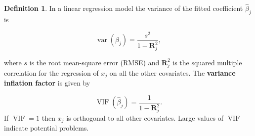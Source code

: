 \documentclass[
  openany]{book}
\theoremstyle{definition}
\newtheorem{definition}{Definition}[chapter]
\theoremstyle{definition}
\theoremstyle{definition}
\theoremstyle{definition}
\theoremstyle{remark}
\begin{document}
\begin{definition}
In a linear regression model the variance of the fitted coefficient \(\hat\beta_j\) is

\[\operatorname{var}\left(\hat\beta_j\right) = \frac{s^2}{1-\mathbf{R}^2_j},\]

where \(s\) is the root mean-square error (RMSE) and \(\mathbf{R}^2_j\) is the squared multiple correlation for the regression of \(x_j\) on all the other covariates. The \textbf{variance inflation factor} is given by

\[\operatorname{VIF}\left(\hat\beta_j\right) = \frac{1}{1-\mathbf{R}^2_j}.\]
If \(\operatorname{VIF}=1\) then \(x_j\) is orthogonal to all other covariates. Large values of \(\operatorname{VIF}\) indicate potential problems.
\end{definition}
\end{document}
